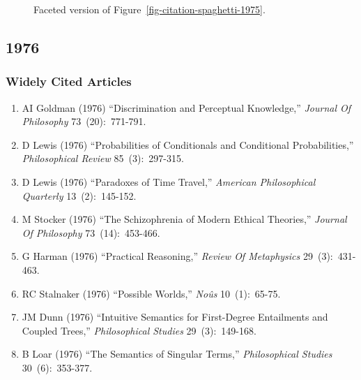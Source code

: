 \documentclass[
  10pt,
  letterpaper,
  DIV=11,
  numbers=noendperiod,
  twoside]{scrartcl}
\providecommand{\tightlist}{%
  \setlength{\itemsep}{0pt}\setlength{\parskip}{0pt}}\usepackage{longtable,booktabs,array}
\begin{document}
\begin{figure}


\caption{\label{fig-citation-facet-1975}Faceted version of
Figure~\ref{fig-citation-spaghetti-1975}.}

\end{figure}%

\newpage

\subsection{1976}\label{sec-s1976}

\subsubsection*{Widely Cited Articles}\label{widely-cited-articles-19}

\begin{enumerate}
\def\labelenumi{\arabic{enumi}.}
\tightlist
\item
  AI Goldman (1976) ``Discrimination and Perceptual Knowledge,''
  \emph{Journal Of Philosophy} 73~(20):~771-791.
\item
  D Lewis (1976) ``Probabilities of Conditionals and Conditional
  Probabilities,'' \emph{Philosophical Review} 85~(3):~297-315.
\item
  D Lewis (1976) ``Paradoxes of Time Travel,'' \emph{American
  Philosophical Quarterly} 13~(2):~145-152.
\item
  M Stocker (1976) ``The Schizophrenia of Modern Ethical Theories,''
  \emph{Journal Of Philosophy} 73~(14):~453-466.
\item
  G Harman (1976) ``Practical Reasoning,'' \emph{Review Of Metaphysics}
  29~(3):~431-463.
\item
  RC Stalnaker (1976) ``Possible Worlds,'' \emph{Noûs} 10~(1):~65-75.
\item
  JM Dunn (1976) ``Intuitive Semantics for First-Degree Entailments and
  Coupled Trees,'' \emph{Philosophical Studies} 29~(3):~149-168.
\item
  B Loar (1976) ``The Semantics of Singular Terms,'' \emph{Philosophical
  Studies} 30~(6):~353-377.
\end{enumerate}
\end{document}

